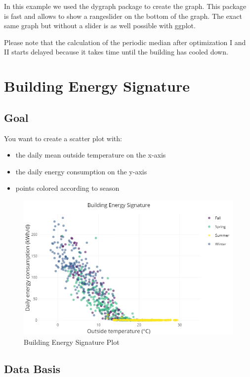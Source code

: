 \documentclass[
  a4paperpaper,
]{book}
\begin{document}
In this example we used the dygraph package to create the graph. This package is fast and allows to show a rangeslider on the bottom of the graph. The exact same graph but without a slider is as well possible with ggplot.

Please note that the calculation of the periodic median after optimization I and II starts delayed because it takes time until the building has cooled down.

\newpage

\hypertarget{building-energy-signature}{%
\section{Building Energy Signature}\label{building-energy-signature}}

\hypertarget{goal-23}{%
\subsection{Goal}\label{goal-23}}

You want to create a scatter plot with:

\begin{itemize}
\item
  the daily mean outside temperature on the x-axis
\item
  the daily energy consumption on the y-axis
\item
  points colored according to season
\end{itemize}

\begin{figure}
\includegraphics[width=0.7\linewidth]{images/plotBldgEngySigScatter} \caption{Building Energy Signature Plot}\label{fig:unnamed-chunk-33}
\end{figure}

\hypertarget{data-basis-23}{%
\subsection{Data Basis}\label{data-basis-23}}
\end{document}
